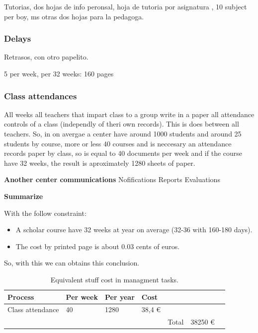 Tutorias, dos hojas de info peronsal, hoja de tutoria por asignatura , 10 subject
per boy, ms otras dos hojas para la pedagoga.



\subsubsection{Delays}

Retrasos, con otro papelito.

5 per week, per 32 weeks: 160 pages


\subsubsection{Class attendances}

All weeks all teachers that impart class to a group write in a paper
all attendance controls of a class (independly of theri own records). This
is does between all teachers. So, in on avergae a center have around 1000 students
and around 25 students by course, more or less 40 courses and is neccesary
an attendance records paper by class, so is equal to 40 documents per week and
if the course have 32 weeks, the result is aproximately 1280 sheets of paper.



\textbf{Another center communications}
Nofifications
Reports
Evaluations


\textbf{Summarize}

With the follow constraint:

\begin{itemize}
\item A scholar course have 32 weeks at year on average (32-36 with 160-180 days).
\item The cost by printed page is about 0.03 cents of euros.
\end{itemize}


So, with this we can obtains this conclusion.

\begin{table}[H]
\centering

\begin{tabular}{@{}lllllll@{}}

Process & Per week  & Per year  & Cost  \\
\midrule

Class attendance  &  40  &  1280  &   38,4   \euro  \\


\midrule
& & & & Total & 38250 \euro \\
\end{tabular}
\caption{Equivalent stuff cost in managment tasks. }
\label{my-label}
\end{table}




